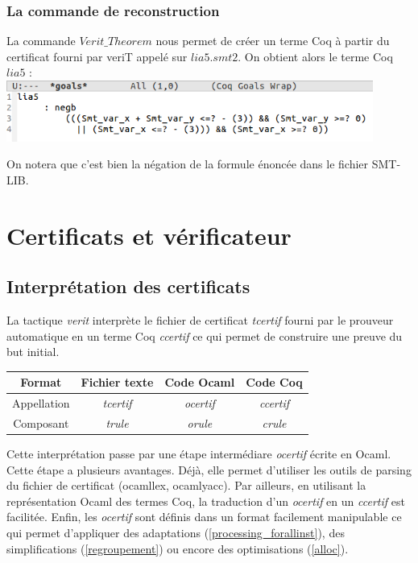 \documentclass[11pt]{article}
\begin{document}
\subsubsection{La commande de reconstruction}

La commande $Verit\_Theorem$ nous permet de créer un terme Coq à partir du certificat fourni par veriT appelé sur $lia5.smt2$. On obtient alors le terme Coq $lia5$ : \\

\includegraphics[height=2cm]{checklia5.png}

On notera que c'est bien la négation de la formule énoncée dans le fichier SMT-LIB. 


\newpage
\section{Certificats et vérificateur}

\subsection{Interprétation des certificats}

La tactique \textit{verit} interprète le fichier de certificat \textit{tcertif} fourni par le prouveur automatique en un terme Coq \textit{ccertif} ce qui permet de construire une preuve du but initial. \\

\begin{center}
\begin{tabular}{ |c||c|c|c| } 
 \hline
 Format & Fichier texte & Code Ocaml & Code Coq \\ 
 \hline
 Appellation & \textit{tcertif} & \textit{ocertif} & \textit{ccertif} \\ 
 \hline
 Composant & \textit{trule} & \textit{orule} & \textit{crule} \\ 
 \hline
\end{tabular}
\end{center}

Cette interprétation passe par une étape intermédiare \textit{ocertif} écrite en Ocaml. Cette étape a plusieurs avantages. Déjà, elle permet d'utiliser les outils de parsing du fichier de certificat (ocamllex, ocamlyacc). Par ailleurs, en utilisant la représentation Ocaml des termes Coq, la traduction d'un \textit{ocertif} en un \textit{ccertif} est facilitée. Enfin, les \textit{ocertif} sont définis dans un format facilement manipulable ce qui permet d'appliquer des adaptations (\ref{processing_forallinst}), des simplifications (\ref{regroupement}) ou encore des optimisations (\ref{alloc}).
\end{document}
